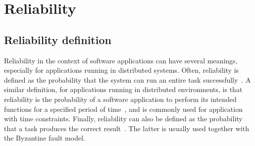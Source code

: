 \documentclass{cslthse-msc}
\begin{document}
\section{Reliability} \label{sec:background_reliability}
\subsection{Reliability definition} \label{subsec:background_reliability_definition}
Reliability in the context of software applications can have several meanings, especially for applications running in distributed systems. Often, reliability is defined as the probability that the system can run an entire task successfully~\cite{taskAllocation, relModelDistSimSystem, studyServiceRel, hierarchicalRelModeling, generalAlgoRelEval, realTimeRelAnalysis, selfAdaptRel, perfRelNonMarkovian}. A similar definition, for applications running in distributed environments, is that reliability is the probability of a software application to perform its intended functions for a specified period of time~\cite{surveyReliabilityDistr, surveyRelPrediction, relDistApplications}, and is commonly used for application with time constraints. Finally, reliability can also be defined as the probability that a task produces the correct result~\cite{surveyRelPrediction, relAndPerfGridServices, relGridServicePredConstraint, relModelWebServices, selfAdaptRel}. The latter is usually used together with the Byzantine fault model. 

\end{document}
